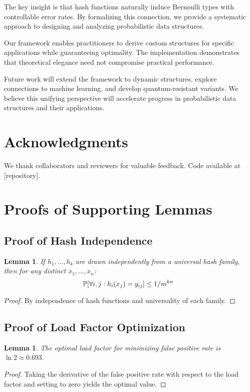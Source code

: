 \documentclass[11pt]{article}
\newtheorem{lemma}[theorem]{Lemma}
\begin{document}
The key insight is that hash functions naturally induce Bernoulli types with controllable error rates. By formalizing this connection, we provide a systematic approach to designing and analyzing probabilistic data structures.

Our framework enables practitioners to derive custom structures for specific applications while guaranteeing optimality. The implementation demonstrates that theoretical elegance need not compromise practical performance.

Future work will extend the framework to dynamic structures, explore connections to machine learning, and develop quantum-resistant variants. We believe this unifying perspective will accelerate progress in probabilistic data structures and their applications.

\section*{Acknowledgments}
We thank collaborators and reviewers for valuable feedback. Code available at [repository].




\appendix

\section{Proofs of Supporting Lemmas}

\subsection{Proof of Hash Independence}

\begin{lemma}
If $h_1, \ldots, h_k$ are drawn independently from a universal hash family, then for any distinct $x_1, \ldots, x_n$:
$$\mathbb{P}[\forall i,j: h_i(x_j) = y_{ij}] \leq 1/m^{kn}$$
\end{lemma}

\begin{proof}
By independence of hash functions and universality of each family.
\end{proof}

\subsection{Proof of Load Factor Optimization}

\begin{lemma}
The optimal load factor for minimizing false positive rate is $\ln 2 \approx 0.693$.
\end{lemma}

\begin{proof}
Taking the derivative of the false positive rate with respect to the load factor and setting to zero yields the optimal value.
\end{proof}
\end{document}
